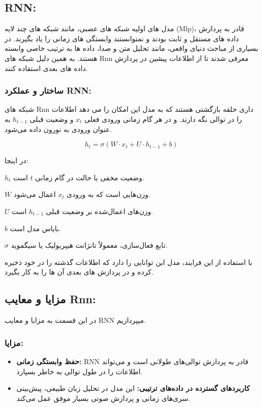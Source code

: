 \subsection{RNN:}
مدل های اولیه شبکه های عصبی، مانند شبکه های چند لایه (Mlp)، قادر به پردازش داده های مستقل و ثابت بودند و نمتوانستند وابستگی های زمانی را یاد بگیرند.
در بسیاری از مباحث دنیای واقعی، مانند تحلیل متن و صدا، داده ها به ترتیب خاصی وابسته هستند. به همین دلیل شبکه های Rnn  معرفی شدند تا از  اطلاعات پیشین در پردازش  داده های بعدی استفاده کنند.

\subsubsection{ساختار و عملکرد RNN:}
شبکه های Rnn داری حلقه بازگشتی هستند که به مدل این امکان را می دهد اطلاعات را در توالی نگه دارند. و در هر گام زمانی ورودی فعلی \( x_t \) و وضعیت قبلی \( h_{t-1} \) به عنوان ورودی به نورون داده می‌شود.


\begin{equation}
	h_t = \sigma(W \cdot x_t + U \cdot h_{t-1} + b)
\end{equation}

در اینجا:

$h_t$ وضعیت مخفی یا حالت در گام زمانی $t$ است.

$W$ وزن‌هایی است که به ورودی $x_t$ اعمال می‌شود.

$U$ وزن‌های اعمال‌شده بر وضعیت قبلی $h_{t-1}$ است.

$b$ بایاس مدل است.

$\sigma$ تابع فعال‌سازی، معمولاً تانژانت هیپربولیک یا سیگموید.

با استفاده از این فرایند، مدل این توانایی را دارد که اطلاعات گذشته را در خود ذخیره کرده و در پردازش های بعدی آن ها را به کار بگیرد.





\subsection{مزایا و معایب Rnn:}
در این قسمت به مزایا و معایب RNN میپردازیم.



\subsubsection{مزایا:}


\begin{itemize}
	\item \textbf{حفظ وابستگی زمانی:} RNN قادر به پردازش توالی‌های طولانی است و می‌تواند اطلاعات را در طول توالی به خاطر بسپارد.
	
	\item \textbf{کاربردهای گسترده در داده‌های ترتیبی:} این مدل در تحلیل زبان طبیعی، پیش‌بینی سری‌های زمانی و پردازش صوتی بسیار موفق عمل می‌کند.
	
\end{itemize}


